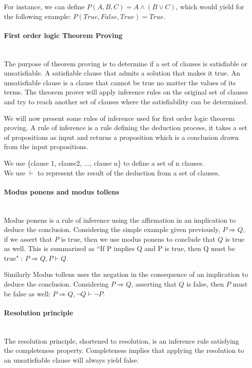 For instance, we can define $P(A,B,C) = A \wedge (B \vee C)$, which would yield for the following example: $P(True,False,True)=True$.

\paragraph{First order logic Theorem Proving}\textbf{\\}
The purpose of theorem proving is to determine if a set of clauses is satisfiable or unsatisfiable.
A satisfiable clause that admits a solution that makes it true.
An unsatisfiable clause is a clause that cannot be true no matter the values of its terms.
The theorem prover will apply inference rules on the original set of clauses and try to reach another set of clauses where the satisfiability can be determined.

We will now present some rules of inference used for first order logic theorem proving.
A rule of inference is a rule defining the deduction process, it takes a set of propositions as input and returns a proposition which is a conclusion drawn from the input propositions.

We use \{clause 1, clause2, ..., clause n\} to define a set of n clauses.\\
We use $\vdash$ to represent the result of the deduction from a set of clauses.

\paragraph{Modus ponens and modus tollens}\textbf{\\}
Modus ponens is a rule of inference using the affirmation in an implication to deduce the conclusion.
Considering the simple example given previously, $P \Rightarrow Q$, if we assert that $P$ is true, then we use modus ponens to conclude that $Q$ is true as well. This is summarized as ``If P implies Q and P is true, then Q must be true" : $P \Rightarrow Q, P \vdash Q$.

Similarly Modus tollens uses the negation in the consequence of an implication to deduce the conclusion.
Considering $P \Rightarrow Q$, asserting that $Q$ is false, then $P$ must be false as well: $P \Rightarrow Q, \neg Q \vdash \neg P$.

\paragraph{Resolution principle}\textbf{\\}
The resolution principle, shortened to resolution, is an inference rule satisfying the completeness property. Completeness implies that applying the resolution to an unsatisfiable clause will always yield false. 

